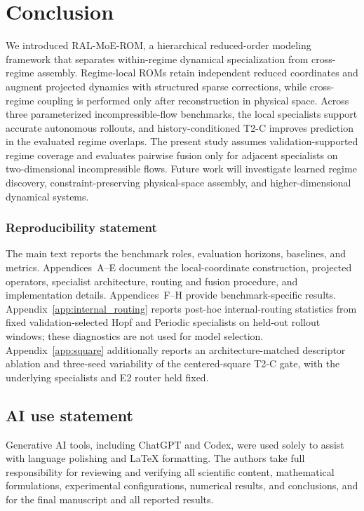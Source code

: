 \documentclass{article}
\begin{document}
\FloatBarrier
\section{Conclusion}

We introduced RAL-MoE-ROM, a hierarchical reduced-order modeling framework that separates within-regime dynamical specialization from cross-regime assembly. Regime-local ROMs retain independent reduced coordinates and augment projected dynamics with structured sparse corrections, while
cross-regime coupling is performed only after reconstruction in physical space. Across three parameterized incompressible-flow benchmarks, the local specialists support accurate autonomous rollouts, and history-conditioned T2-C improves prediction in the evaluated regime overlaps. The present study assumes validation-supported regime coverage and evaluates pairwise fusion only for adjacent specialists on two-dimensional incompressible flows. Future work will investigate learned regime discovery, constraint-preserving physical-space assembly, and higher-dimensional dynamical systems.


\subsubsection*{Reproducibility statement}
The main text reports the benchmark roles, evaluation horizons, baselines, and metrics. Appendices~A--E document the local-coordinate construction, projected operators, specialist architecture, routing and fusion procedure, and implementation details. Appendices~F--H provide benchmark-specific results.
Appendix~\ref{app:internal_routing} reports post-hoc internal-routing statistics
from fixed validation-selected Hopf and Periodic specialists on held-out
rollout windows; these diagnostics are not used for model selection.
Appendix~\ref{app:square} additionally reports an architecture-matched descriptor
ablation and three-seed variability of the centered-square T2-C gate, with the
underlying specialists and E2 router held fixed.

\subsection*{AI use statement}
Generative AI tools, including ChatGPT and Codex, were used solely to assist with language polishing and LaTeX formatting. The authors take full responsibility for reviewing and verifying all scientific
content, mathematical formulations, experimental configurations, numerical
results, and conclusions, and for the final manuscript and all reported results.
\end{document}
